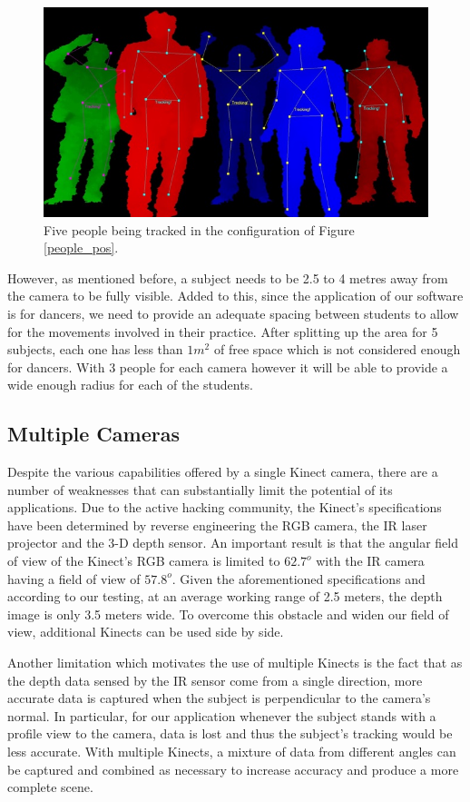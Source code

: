 \documentclass[a4paper]{article}
\begin{document}
\begin{figure}[H]
\centering
\includegraphics[scale=0.8]{multi_people2.jpg}
\caption{Five people being tracked in the configuration of Figure \ref{people_pos}.}
\end{figure}
\noindent
However, as mentioned before, a subject needs to be 2.5 to 4 metres away from the camera to be fully visible. Added to this, since the application of our software is for dancers, we need to provide an adequate spacing between students to allow for the movements involved in their practice. After splitting up the area for 5 subjects, each one has less than $1m^2$ of free space which is not considered enough for dancers. With 3 people for each camera however it will be able to provide a wide enough radius for each of the students.\\


\subsection{Multiple Cameras}
\noindent
Despite the various capabilities offered by a single Kinect camera, there are a number of weaknesses that can substantially limit the potential of its applications. Due to the active hacking community, the Kinect's specifications have been determined by reverse engineering the RGB camera, the IR laser projector and the 3-D depth sensor. An important result is that the angular field of view of the Kinect's RGB camera is limited to $62.7^o$ with the IR camera having a field of view of $57.8^o$. Given the aforementioned specifications and according to our testing, at an average working range of 2.5 meters, the depth image is only 3.5 meters wide. To overcome this obstacle and widen our field of view, additional Kinects can be used side by side. 

Another limitation which motivates the use of multiple Kinects is the fact that as the depth data sensed by the IR sensor come from a single direction, more accurate data is captured when the subject is perpendicular to the camera's normal. In particular, for our application whenever the subject stands with a profile view to the camera, data is lost and thus the subject's tracking would be less accurate. With multiple Kinects, a mixture of data from different angles can be captured and combined as necessary to increase accuracy and produce a more complete scene.
\end{document}
